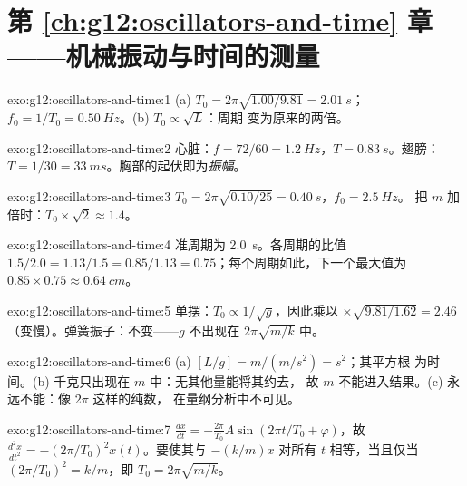 \section*{第 \ref{ch:g12:oscillators-and-time} 章——机械振动与时间的测量}

\begin{solution}{exo:g12:oscillators-and-time:1}
(a) $T_0 = 2\pi\sqrt{1.00/9.81} = \qty{2.01}{s}$；
$f_0 = 1/T_0 = \qty{0.50}{Hz}$。(b) $T_0 \propto \sqrt{L}$：周期
变为原来的两倍。
\end{solution}

\begin{solution}{exo:g12:oscillators-and-time:2}
心脏：$f = 72/60 = \qty{1.2}{Hz}$，$T = \qty{0.83}{s}$。翅膀：
$T = 1/30 = \qty{33}{ms}$。胸部的起伏即为\emph{振幅}。
\end{solution}

\begin{solution}{exo:g12:oscillators-and-time:3}
$T_0 = 2\pi\sqrt{0.10/25} = \qty{0.40}{s}$，$f_0 = \qty{2.5}{Hz}$。
把 $m$ 加倍时：$T_0 \times \sqrt{2} \approx 1.4$。
\end{solution}

\begin{solution}{exo:g12:oscillators-and-time:4}
准周期为 \qty{2.0}{s}。各周期的比值 $1.5/2.0 = 1.13/1.5 = 0.85/1.13
= 0.75$；每个周期如此，下一个最大值为 $0.85 \times 0.75 \approx
\qty{0.64}{cm}$。
\end{solution}

\begin{solution}{exo:g12:oscillators-and-time:5}
单摆：$T_0 \propto 1/\sqrt{g}$，因此乘以 $\times\sqrt{9.81/1.62} =
2.46$（变慢）。弹簧振子：不变——$g$ 不出现在
$2\pi\sqrt{m/k}$ 中。
\end{solution}

\begin{solution}{exo:g12:oscillators-and-time:6}
(a) $[L/g] = \unit{m}/(\unit{m/s^2}) = \unit{s^2}$；其平方根
为时间。(b) 千克只出现在 $m$ 中：无其他量能将其约去，
故 $m$ 不能进入结果。(c) 永远不能：像 $2\pi$ 这样的纯数，
在量纲分析中不可见。
\end{solution}

\begin{solution}{exo:g12:oscillators-and-time:7}
$\frac{dx}{dt} = -\frac{2\pi}{T_0}A\sin(2\pi t/T_0 + \varphi)$，故
$\frac{d^2x}{dt^2} = -(2\pi/T_0)^2 x(t)$。要使其与 $-(k/m)x$
对所有 $t$ 相等，当且仅当 $(2\pi/T_0)^2 = k/m$，即
$T_0 = 2\pi\sqrt{m/k}$。
\end{solution}

